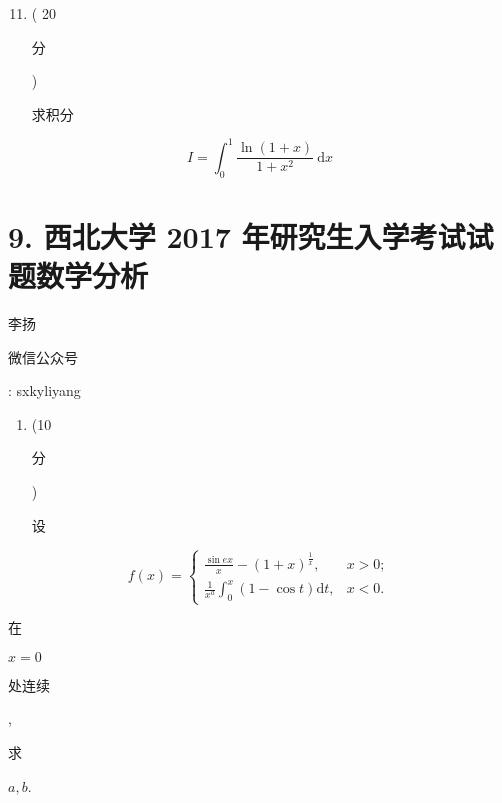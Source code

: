 \documentclass[10pt]{article}
\begin{document}
\begin{enumerate}
  \setcounter{enumi}{10}
  \item ( 20 \begin{CJK}{UTF8}{mj}分\end{CJK}) \begin{CJK}{UTF8}{mj}求积分\end{CJK}
\end{enumerate}
$$
I=\int_{0}^{1} \frac{\ln (1+x)}{1+x^{2}} \mathrm{~d} x
$$

\section{9. 西北大学 2017 年研究生入学考试试题数学分析}
\begin{CJK}{UTF8}{mj}李扬\end{CJK}

\begin{CJK}{UTF8}{mj}微信公众号\end{CJK}: sxkyliyang

\begin{enumerate}
  \item (10 \begin{CJK}{UTF8}{mj}分\end{CJK}) \begin{CJK}{UTF8}{mj}设\end{CJK}
\end{enumerate}
$$
f(x)= \begin{cases}\frac{\sin e x}{x}-(1+x)^{\frac{1}{x}}, & x>0 ; \\ \frac{1}{x^{a}} \int_{0}^{x}(1-\cos t) \mathrm{d} t, & x<0 .\end{cases}
$$
\begin{CJK}{UTF8}{mj}在\end{CJK} $x=0$ \begin{CJK}{UTF8}{mj}处连续\end{CJK}, \begin{CJK}{UTF8}{mj}求\end{CJK} $a, b$.
\end{document}
